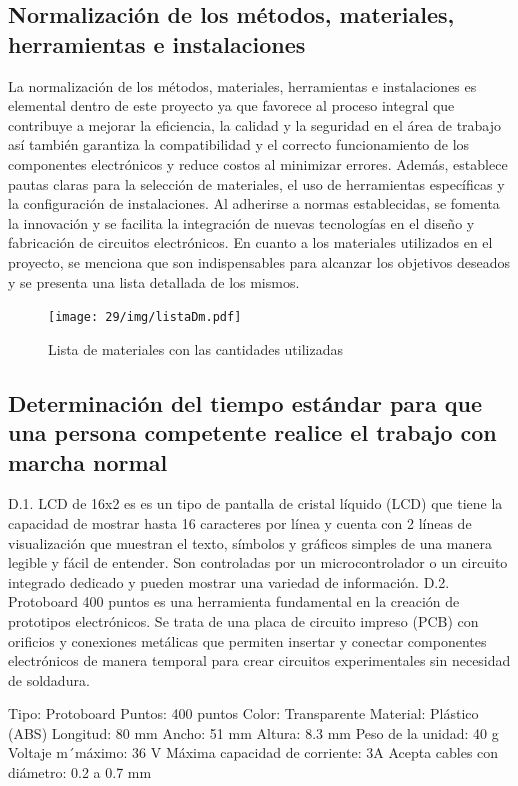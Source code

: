     \subsection{Normalización de los métodos, materiales, herramientas e instalaciones}
    La normalización de los métodos, materiales, herramientas e instalaciones es elemental dentro de este proyecto ya que  favorece al  proceso integral que contribuye a mejorar la eficiencia, la calidad y la seguridad en el área de trabajo 
    así también  garantiza la compatibilidad y el correcto funcionamiento de los componentes electrónicos y  reduce costos al minimizar errores. Además, establece pautas claras para la selección de materiales, el uso de herramientas específicas y la configuración de instalaciones. Al adherirse a normas establecidas, se fomenta la innovación y se facilita la integración de nuevas tecnologías en el diseño y fabricación de circuitos electrónicos. En cuanto a los materiales utilizados en el proyecto, se menciona que son indispensables para alcanzar los objetivos deseados y se presenta una lista detallada de los mismos.
    \begin{figure}[H]
        \centering
        \texttt{[image: 29/img/listaDm.pdf]}
        \caption{Lista de materiales con las cantidades utilizadas  }
        \label{fig:listaDm.pdf}
    \end{figure}
    \subsection{Determinación del tiempo estándar para que una persona competente realice el trabajo con marcha normal}
    D.1. LCD de 16x2 es es un tipo de pantalla de cristal líquido (LCD) que tiene la capacidad de mostrar hasta 16 caracteres por línea y cuenta con 2 líneas de visualización que muestran el  texto, símbolos y gráficos simples de una manera legible y fácil de entender. Son controladas por un microcontrolador o un circuito integrado dedicado y pueden mostrar una variedad de información.
    D.2. Protoboard 400 puntos es una herramienta fundamental en la creación de prototipos electrónicos. Se trata de una placa de circuito impreso (PCB) con orificios y conexiones metálicas que permiten insertar y conectar componentes electrónicos de manera temporal para crear circuitos experimentales sin necesidad de soldadura.
    
    Tipo: Protoboard
    Puntos: 400 puntos
    Color: Transparente
    Material: Plástico (ABS)
    Longitud: 80 mm
    Ancho: 51 mm
    Altura: 8.3 mm
    Peso de la unidad: 40 g
    Voltaje m´máximo: 36 V
    Máxima capacidad de corriente: 3A
    Acepta cables con diámetro: 0.2 a 0.7 mm
    
